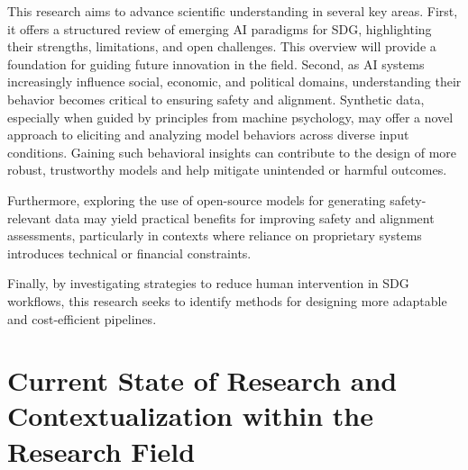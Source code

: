 \documentclass[12pt,a4paper]{article}
\begin{document}
This research aims to advance scientific understanding in several key areas. First, it offers a structured review of emerging AI paradigms for SDG, highlighting their strengths, limitations, and open challenges. This overview will provide a foundation for guiding future innovation in the field. Second, as AI systems increasingly influence social, economic, and political domains, understanding their behavior becomes critical to ensuring safety and alignment. Synthetic data, especially when guided by principles from machine psychology, may offer a novel approach to eliciting and analyzing model behaviors across diverse input conditions. Gaining such behavioral insights can contribute to the design of more robust, trustworthy models and help mitigate unintended or harmful outcomes.

Furthermore, exploring the use of open-source models for generating safety-relevant data may yield practical benefits for improving safety and alignment assessments, particularly in contexts where reliance on proprietary systems introduces technical or financial constraints.
 

Finally, by investigating strategies to reduce human intervention in SDG workflows, this research seeks to identify methods for designing more adaptable and cost-efficient pipelines.




\section{Current State of Research and Contextualization within the Research Field}
\end{document}

